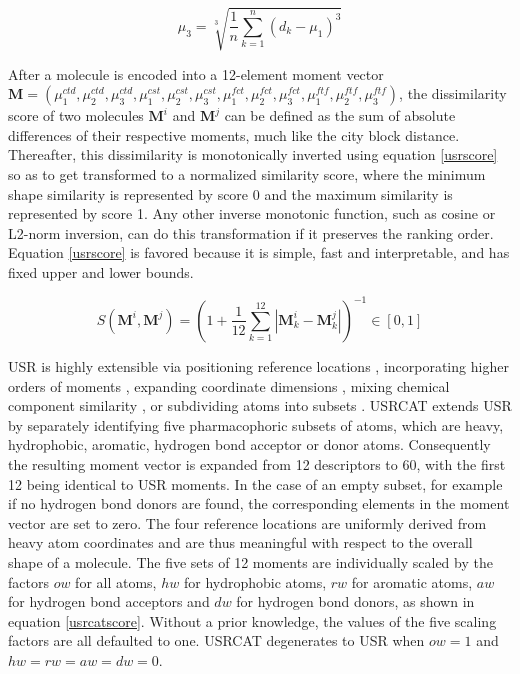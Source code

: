 \documentclass[a4,center,fleqn]{NAR}
\begin{document}
\begin{equation}
\mu_3=\sqrt[3]{\frac{1}{n}\sum_{k=1}^{n}{(d_k-\mu_1)^3}}
\label{moment3}
\end{equation}

After a molecule is encoded into a 12-element moment vector $\mathbf M=(\mu_1^{ctd}, \mu_2^{ctd}, \mu_3^{ctd}, \mu_1^{cst}, \mu_2^{cst}, \mu_3^{cst}, \mu_1^{fct}, \mu_2^{fct}, \mu_3^{fct}, \mu_1^{ftf}, \mu_2^{ftf}, \mu_3^{ftf})$, the dissimilarity score of two molecules $\mathbf M^i$ and $\mathbf M^j$ can be defined as the sum of absolute differences of their respective moments, much like the city block distance. Thereafter, this dissimilarity is monotonically inverted using equation \eqref{usrscore} so as to get transformed to a normalized similarity score, where the minimum shape similarity is represented by score 0 and the maximum similarity is represented by score 1. Any other inverse monotonic function, such as cosine or L2-norm inversion, can do this transformation if it preserves the ranking order. Equation \eqref{usrscore} is favored because it is simple, fast and interpretable, and has fixed upper and lower bounds.

\begin{equation}
S(\mathbf M^i, \mathbf M^j)=(1+\frac{1}{12}\sum_{k=1}^{12}|\mathbf M_k^i-\mathbf M_k^j|)^{-1}\in[0, 1]
\label{usrscore}
\end{equation}

USR \cite{1379} is highly extensible via positioning reference locations \cite{1334,1335}, incorporating higher orders of moments \cite{1333,1337}, expanding coordinate dimensions \cite{1337,1338}, mixing chemical component similarity \cite{1333,1407,1408}, or subdividing atoms into subsets \cite{1436,1331}. USRCAT \cite{1331} extends USR \cite{1379} by separately identifying five pharmacophoric subsets of atoms, which are heavy, hydrophobic, aromatic, hydrogen bond acceptor or donor atoms. Consequently the resulting moment vector is expanded from 12 descriptors to 60, with the first 12 being identical to USR moments. In the case of an empty subset, for example if no hydrogen bond donors are found, the corresponding elements in the moment vector are set to zero. The four reference locations are uniformly derived from heavy atom coordinates and are thus meaningful with respect to the overall shape of a molecule. The five sets of 12 moments are individually scaled by the factors $ow$ for all atoms, $hw$ for hydrophobic atoms, $rw$ for aromatic atoms, $aw$ for hydrogen bond acceptors and $dw$ for hydrogen bond donors, as shown in equation \eqref{usrcatscore}. Without a prior knowledge, the values of the five scaling factors are all defaulted to one. USRCAT degenerates to USR when $ow=1$ and $hw=rw=aw=dw=0$.
\end{document}
